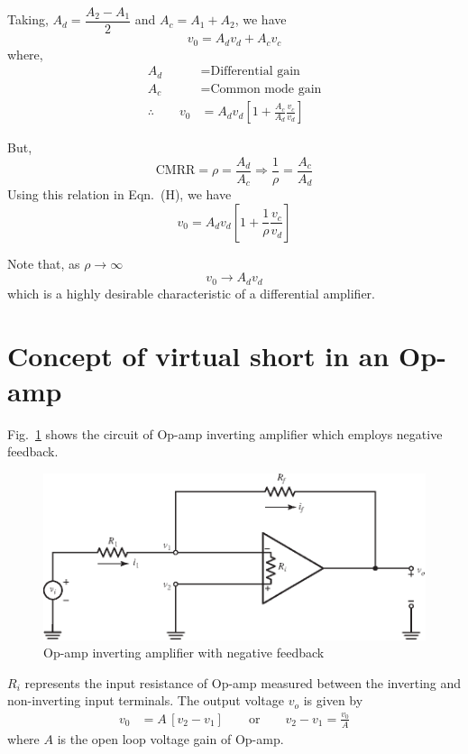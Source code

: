 \begin{solution}
Taking, $A_{d}=\dfrac{A_{2}-A_{1}}{2}$ and $A_{c}=A_{1}+A_{2}$, we have
\begin{equation*}
v_{0}=A_{d}v_{d}+A_{c}v_{c}\tag{G}
\end{equation*}
where, 
\begin{align*}
A_{d} &= \text{Differential gain}\\[3pt]
A_{c} &= \text{Common mode gain}\\[3pt]
\therefore\qquad v_{0} &=A_{d}v_{d}\left[1+\frac{A_{c}}{A_{d}}\frac{v_{c}}{v_{d}}\right]\tag{H}
\end{align*}

But,
$$
\text{CMRR}=\rho =\dfrac{A_{d}}{A_{c}}\Rightarrow \frac{1}{\rho}=\frac{A_{c}}{A_{d}}
$$
Using this relation in Eqn.~(H), we have
\begin{equation*}
v_{0}=A_{d}v_{d}\left[1+\frac{1}{\rho}\frac{v_{c}}{v_{d}}\right]\tag{I}
\end{equation*}

Note that, as $\rho\to \infty$
$$
v_{0}\to A_{d}v_{d}
$$
which is a highly desirable characteristic of a differential amplifier.
\end{solution}

\section{Concept of virtual short in an Op-amp}\label{sec5.6}

Fig.~\ref{fig5.7} shows the circuit of Op-amp inverting amplifier which employs negative feedback.
\begin{figure}[H]
\centering
\includegraphics{chap4/S3-EE-06-011.eps}
\caption{Op-amp inverting amplifier with negative feedback}\label{fig5.7}
\end{figure}

\noindent
$R_{i}$ represents the input resistance of Op-amp measured between the inverting and non-inverting input terminals. The output voltage $v_{o}$ is given by
\begin{align}
v_{0} &= A\,[v_{2}-v_{1}]\qquad
\text{or}\qquad v_{2}-v_{1} = \frac{v_{0}}{A}\label{eq5.15}
\end{align}
where $A$ is the open loop voltage gain of Op-amp.

